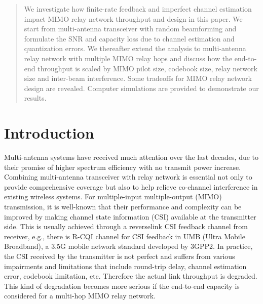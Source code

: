 \documentclass[conference]{IEEEtran}
\begin{document}
\begin{abstract}
We investigate how finite-rate feedback and imperfect channel
estimation impact MIMO relay network throughput and design in this
paper. We start from multi-antenna transceiver with random
beamforming and formulate the SNR and capacity loss due to channel
estimation and quantization errors. We thereafter extend the
analysis to multi-antenna relay network with multiple MIMO relay
hops and discuss how the end-to-end throughput is scaled by MIMO
pilot size, codebook size, relay network size and inter-beam
interference. Some tradeoffs for MIMO relay network design are
revealed. Computer simulations are provided to demonstrate our
results.
\end{abstract}





%
\IEEEpeerreviewmaketitle

\section{Introduction}
Multi-antenna systems have received much attention over the last
decades, due to their promise of higher spectrum efficiency with
no transmit power increase. Combining multi-antenna transceiver
with relay network is essential not only to provide comprehensive
coverage but also to help relieve co-channel interference in
existing wireless systems. For multiple-input multiple-output
(MIMO) transmission, it is well-known that their performance and
complexity can be improved by making channel state information
(CSI) available at the transmitter side. This is usually achieved
through a reverselink CSI feedback channel from receiver, e.g.,
there is R-CQI channel for CSI feedback in UMB (Ultra Mobile
Broadband), a 3.5G mobile network standard developed by 3GPP2. In
practice, the CSI received by the transmitter is not perfect and
suffers from various impairments and limitations that include
round-trip delay, channel estimation error, codebook limitation,
etc. Therefore the actual link throughput is degraded. This kind
of degradation becomes more serious if the end-to-end capacity is
considered for a multi-hop MIMO relay network.
\end{document}
